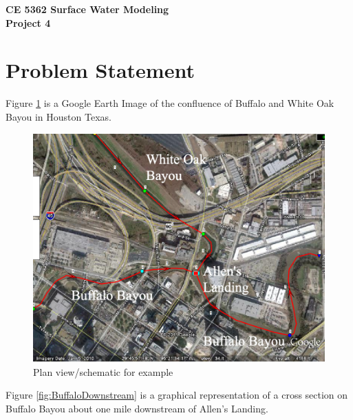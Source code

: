 \documentclass[12pt]{article}
\begin{document}
\begin{center}
{\textbf{{ CE 5362 Surface Water Modeling} \\ {Project 4}}}
\end{center}

\section*{{Problem Statement}}
Figure  \ref{fig:HoustonBase} is a Google Earth Image of the confluence of Buffalo and White Oak Bayou in Houston Texas.

\begin{figure}[h!] %
   \centering
   \includegraphics[width=5.5in]{HoustonBase.png} 
   \caption{Plan view/schematic for example}
   \label{fig:HoustonBase}
\end{figure}

\clearpage

Figure  \ref{fig:BuffaloDownstream} is a graphical representation of a cross section on Buffalo Bayou  about one mile downstream of Allen's Landing.
\end{document}
